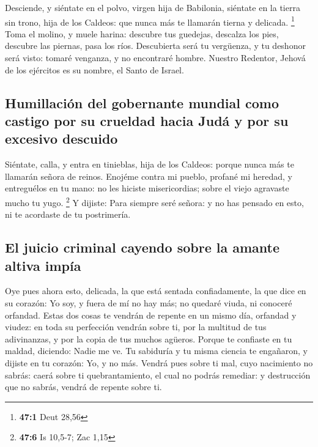  Desciende, y siéntate en el polvo, virgen hija de
Babilonia, siéntate en la tierra sin trono, hija de los Caldeos: que
nunca más te llamarán tierna y delicada. \footnote{\textbf{47:1} Deut
  28,56}  Toma el molino, y muele harina: descubre tus
guedejas, descalza los pies, descubre las piernas, pasa los ríos.
 Descubierta será tu vergüenza, y tu deshonor será visto:
tomaré venganza, y no encontraré hombre.  Nuestro
Redentor, Jehová de los ejércitos es su nombre, el Santo de Israel.

\hypertarget{humillaciuxf3n-del-gobernante-mundial-como-castigo-por-su-crueldad-hacia-juduxe1-y-por-su-excesivo-descuido}{%
\subsection{Humillación del gobernante mundial como castigo por su
crueldad hacia Judá y por su excesivo
descuido}\label{humillaciuxf3n-del-gobernante-mundial-como-castigo-por-su-crueldad-hacia-juduxe1-y-por-su-excesivo-descuido}}

 Siéntate, calla, y entra en tinieblas, hija de los
Caldeos: porque nunca más te llamarán señora de reinos. 
Enojéme contra mi pueblo, profané mi heredad, y entreguélos en tu mano:
no les hiciste misericordias; sobre el viejo agravaste mucho tu yugo.
\footnote{\textbf{47:6} Is 10,5-7; Zac 1,15}  Y dijiste:
Para siempre seré señora: y no has pensado en esto, ni te acordaste de
tu postrimería.

\hypertarget{el-juicio-criminal-cayendo-sobre-la-amante-altiva-impuxeda}{%
\subsection{El juicio criminal cayendo sobre la amante altiva
impía}\label{el-juicio-criminal-cayendo-sobre-la-amante-altiva-impuxeda}}

 Oye pues ahora esto, delicada, la que está sentada
confiadamente, la que dice en su corazón: Yo soy, y fuera de mí no hay
más; no quedaré viuda, ni conoceré orfandad.  Estas dos
cosas te vendrán de repente en un mismo día, orfandad y viudez: en toda
su perfección vendrán sobre ti, por la multitud de tus adivinanzas, y
por la copia de tus muchos agüeros.  Porque te confiaste
en tu maldad, diciendo: Nadie me ve. Tu sabiduría y tu misma ciencia te
engañaron, y dijiste en tu corazón: Yo, y no más.  Vendrá
pues sobre ti mal, cuyo nacimiento no sabrás: caerá sobre ti
quebrantamiento, el cual no podrás remediar: y destrucción que no
sabrás, vendrá de repente sobre ti.

